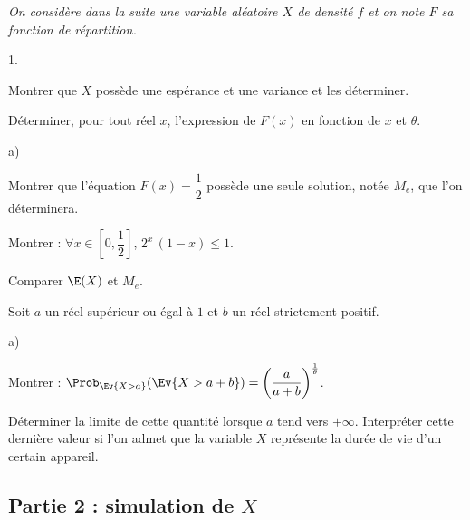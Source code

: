 \documentclass[11pt]{article}%
\begin{document}
\noindent
{\it On considère dans la suite une variable aléatoire $X$ de densité
  $f$ et on note $F$ sa fonction de répartition.}
\begin{noliste}{1.}
  \setlength{\itemsep}{4mm} %
  \setcounter{enumi}{1}
\item Montrer que $X$ possède une espérance et une variance et les
  déterminer.
  
\item Déterminer, pour tout réel $x$, l'expression de $F(x)$ en
  fonction de $x$ et $\theta$.
  
\item
  \begin{noliste}{a)}
    \setlength{\itemsep}{2mm}
  \item Montrer que l'équation $F(x) = \dfrac{1}{2}$ possède une seule
    solution, notée $M_e$, que l'on déterminera.
    
  \item Montrer : $\forall x \in \left[0, \dfrac{1}{2}\right]$, $2^x
    \, (1-x) \leq 1$.
    
  \item Comparer $\E(X)$ et $M_e$.
  \end{noliste}
  
\item Soit $a$ un réel supérieur ou égal à $1$ et $b$ un réel
  strictement positif.
  \begin{noliste}{a)}
    \setlength{\itemsep}{2mm}
  \item Montrer : $\Prob_{\Ev{X >a}}(\Ev{X >a+b}) = \left(
      \dfrac{a}{a+b} \right)^{\frac{1}{\theta}}$.
    
  \item Déterminer la limite de cette quantité lorsque $a$ tend vers
    $+\infty$. Interpréter cette dernière valeur si l'on admet que la
    variable $X$ représente la durée de vie d'un certain appareil.
  \end{noliste}
\end{noliste}


\newpage


\subsection*{Partie 2 : simulation de $X$}
\end{document}
